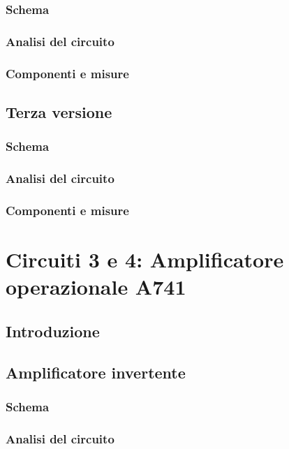 \subsection{Schema} 
\subsection{Analisi del circuito} 
\subsection{Componenti e misure} 
\section{Terza versione} %
\subsection{Schema} 
\subsection{Analisi del circuito} 
\subsection{Componenti e misure} 


\clearpage
\newpage
\chapter{Circuiti 3 e 4: Amplificatore operazionale \textmu A741}
\section{Introduzione} 
\section{Amplificatore invertente} 
\subsection{Schema} 
\subsection{Analisi del circuito} 
